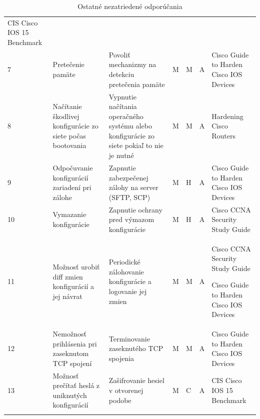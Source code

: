 \begin{longtable}[!htbp]{|C{2.5em}L{9em}L{9em}C{2em}C{2.5em}C{7.5em}L{10em}|}
	CIS Cisco IOS 15 Benchmark \cite{CIS_DrTLsgXv24lxeIIM}\\
	 7	&Pretečenie pamäte	&Povoliť mechanizmy na detekciu pretečenia pamäte	&M	&M	&A	&Cisco Guide to Harden Cisco IOS Devices \cite{Singh2018}\\
	8	&Načítanie škodlivej konfigurácie zo siete počas bootovania	&Vypnutie načítania operačného systému alebo konfigurácie zo siete pokiaľ to nie je nutné	&M	&M	&A	&Hardening Cisco Routers \cite{Akin2002}\\
	 9	&Odpočuvanie konfigurácií zariadení pri zálohe	&Zapnutie zabezpečenej zálohy na server (SFTP, SCP)	&M	&H	&A	&Cisco Guide to Harden Cisco IOS Devices \cite{Singh2018}\\
	10	&Vymazanie konfigurácie	&Zapnutie ochrany pred výmazom konfigurácie	&M	&H	&A	&Cisco CCNA Security Study Guide \cite{McMillan2018}\\
	 11	&Možnosť urobiť diff zmien konfigurácií a jej návrat	&Periodické zálohovanie konfigurácie a logovanie jej zmien	&M	&M	&A	&Cisco CCNA Security Study Guide \cite{McMillan2018}
	
	Cisco Guide to Harden Cisco IOS Devices \cite{Singh2018}\\
	12	&Nemožnosť prihlásenia pri zaseknutom TCP spojení	&Terminovanie zaseknutého TCP spojenia	&M	&M	&A	&Cisco Guide to Harden Cisco IOS Devices \cite{Singh2018}\\
	 13	&Možnosť prečítať heslá z uniknutých konfigurácií	&Zašifrovanie hesiel v otvorenej podobe	&M	&C	&A	&CIS Cisco IOS 15 Benchmark \cite{CIS_DrTLsgXv24lxeIIM}\\
	
	\hline
	\caption{Ostatné nezatriedené odporúčania}
	\label{tab:other}%
\end{longtable}%






\restoregeometry 


